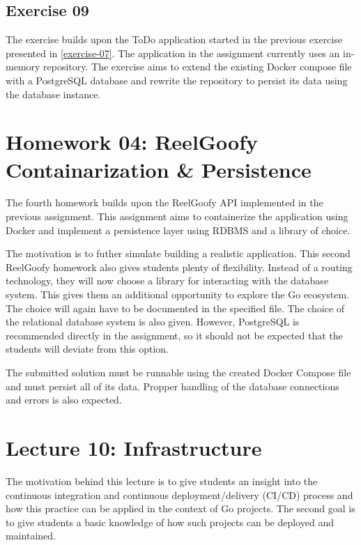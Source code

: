 \documentclass[
  digital,
  color,
  oneside,
  nosansbold,
  nocolorbold,
  nolof,
  nolot,
]{fithesis4}
\begin{document}
\subsection{Exercise 09}\label{exercise-09}

The exercise builds upon the ToDo application started in the previous exercise presented in \cref{exercise-07}. The application in the assignment currently uses an in-memory repository. The exercise aims to extend the existing Docker compose file with a PostgreSQL\cite{postgres} database and rewrite the repository to persist its data using the database instance.

\section{Homework 04: ReelGoofy Containarization \& Persistence}\label{reelgoofy-db}

The fourth homework builds upon the ReelGoofy API implemented in the previous assignment. This assignment aims to containerize the application using Docker and implement a persistence layer using RDBMS and a library of choice.

The motivation is to futher simulate building a realistic application. This second ReelGoofy homework also gives students plenty of flexibility. Instead of a routing technology, they will now choose a library for interacting with the database system. This gives them an additional opportunity to explore the Go ecosystem. The choice will again have to be documented in the specified file. The choice of the relational database system is also given. However, PostgreSQL is recommended directly in the assignment, so it should not be expected that the students will deviate from this option.

The submitted solution must be runnable using the created Docker Compose file and must persist all of its data. Propper handling of the database connections and errors is also expected.

\section{Lecture 10: Infrastructure}\label{lecture-infrastructure}

The motivation behind this lecture is to give students an insight into the continuous integration and continuous deployment/delivery (CI/CD) process and how this practice can be applied in the context of Go projects. The second goal is to give students a basic knowledge of how such projects can be deployed and maintained.
\end{document}
